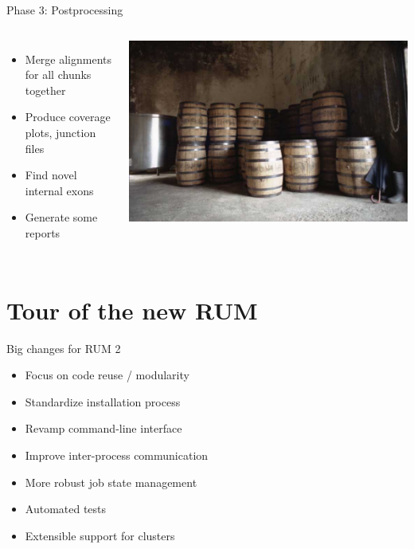 \documentclass{beamer}
\begin{document}
\begin{frame}{Phase 3: Postprocessing}

  \begin{columns}
    \column{2.5in}
    \begin{itemize}
    \item Merge alignments for all chunks together
    \item Produce coverage plots, junction files
    \item Find novel internal exons
    \item Generate some reports
    \end{itemize} 
    \column{2.5in}
    \includegraphics[scale=0.2]{Rum_in_barrels_at_travellers_distillery.jpg}
  \end{columns}
\end{frame}

\section{Tour of the new RUM}

\begin{frame}{Big changes for RUM 2}
  \begin{itemize}
  \item Focus on code reuse / modularity
  \item Standardize installation process
  \item Revamp command-line interface
  \item Improve inter-process communication
  \item More robust job state management
  \item Automated tests
  \item Extensible support for clusters
  \end{itemize}
\end{frame}
\end{document}
